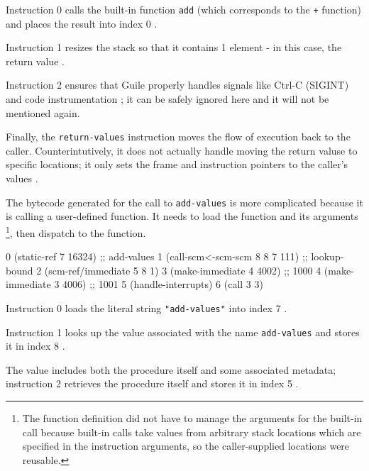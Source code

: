 Instruction 0 calls the built-in function \texttt{add} (which corresponds to the \texttt{+}
function) and places the result into index 0
\parencite[][liguile/vm-engine.c lines 1545-1549]{guile-source}.

Instruction 1 resizes the stack so that it contains 1 element - in this case, the return
value
\parencite[][libguile/vm-engine.c lines 797-802]{guile-source}.

Instruction 2 ensures that Guile properly handles signals like Ctrl-C (SIGINT) and
code instrumentation
\parencite[][Section 9.3.7.6 "Instrumentation Instructions",
             Section 6.22.3  "Asynchronous Interrupts"]{guile-manual};
it can be safely ignored here and it will not be mentioned again.

Finally, the \texttt{return-values} instruction moves the flow of execution back to the
caller.
Counterintutively, it does not actually handle moving the return valuse to
specific locations; it only sets the frame and instruction pointers to the caller's
values
\parencite[][libguile/vm-engine.c lines 530-555]{guile-source}.

The bytecode generated for the call to \texttt{add-values} is more complicated because it
is calling a user-defined function.
It needs to load the function and its arguments
\footnote{
	The function definition did not have to manage the arguments for the built-in call
	because built-in calls take values from arbitrary stack locations which are specified
	in the instruction arguments, so the caller-supplied locations were reusable.
}, then dispatch to the function.

\begin{pygmented}[lang=lisp]
0 (static-ref 7 16324)            ;; add-values
1 (call-scm<-scm-scm 8 8 7 111)   ;; lookup-bound
2 (scm-ref/immediate 5 8 1)
3 (make-immediate 4 4002)         ;; 1000
4 (make-immediate 3 4006)         ;; 1001
5 (handle-interrupts)
6 (call 3 3)
\end{pygmented}

Instruction 0 loads the literal string \texttt{"add-values"} into index 7
\parencite[][libguile/vm-engine.c line 2125-2129]{guile-source}.

Instruction 1 looks up the value associated with the name \texttt{add-values} and stores
it in index 8
\parencite[][libguile/vm-engine.c  lines 1545-1549,
             libguile/intrinsics.c lines 374-376]{guile-source}.

The value includes both the procedure itself and some associated metadata; instruction 2
retrieves the procedure itself and stores it in index 5
\parencite[][libguile/vm-engine.c  lines 1906-1910]{guile-source}.

